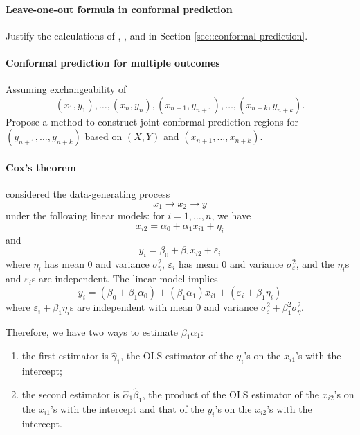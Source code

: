  
 

\paragraph{Leave-one-out formula in conformal prediction}\label{hw11::loo-conformal}

Justify the calculations of , , and  in Section \ref{sec::conformal-prediction}. 




\paragraph{Conformal prediction for multiple outcomes}
Assuming exchangeability of 
$$
(x_1,y_1),\ldots,  (x_n,y_n), (x_{n+1},y_{n+1}), \ldots , (x_{n+k},y_{n+k}).   
$$
Propose a method to construct joint conformal prediction regions for $(y_{n+1},\ldots, y_{n+k})$ based on $(X,Y)$ and $(x_{n+1},\ldots, x_{n+k})$.





\paragraph{Cox's theorem}\label{hw11::cox-theorem1960}


\citet{cox1960jrssb} considered the data-generating process
$$
x_1 \longrightarrow x_2  \longrightarrow y
$$
under the following linear models:
for $i=1,\ldots, n$, we have 
$$
x_{i2} = \alpha_0 + \alpha_1x_{i1} + \eta_i
$$
and
$$
y_i = \beta_0 + \beta_1 x_{i2} + \varepsilon_i
$$
where $\eta_i$ has mean 0 and variance $\sigma_\eta^2$, $\varepsilon_i$ has mean 0 and variance $\sigma_\varepsilon^2$, and the $\eta_i$s and  $\varepsilon_i$s are independent.
The linear model implies
$$
y_i = (\beta_0 + \beta_1\alpha_0) + (\beta_1 \alpha_1) x_{i1} +   (\varepsilon_i  +  \beta_1  \eta_i  )
$$
where $\varepsilon_i  +  \beta_1  \eta_i$s are independent with mean 0 and variance $\sigma_\varepsilon^2 + \beta_1^2 \sigma_\eta^2$. 

Therefore, we have two ways to estimate $\beta_1 \alpha_1$:
\begin{enumerate}
\item
the first estimator is $\hat\gamma_1$,  the OLS estimator of the $y_i$'s on the $x_{i1}$'s with the intercept; 

\item
the second estimator is $\hat\alpha_1 \hat\beta_1$, the product of the OLS estimator of the $x_{i2}$'s on the $x_{i1}$'s with the intercept and that of the $y_i$'s on the $x_{i2}$'s with the intercept. 
\end{enumerate}

